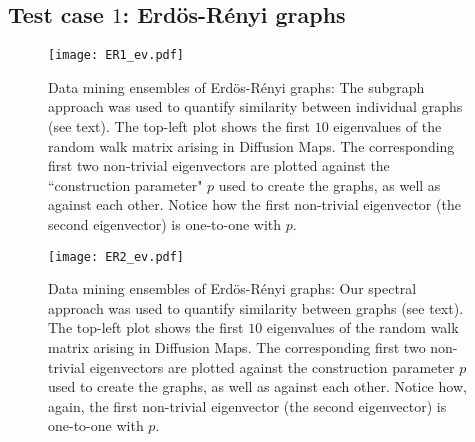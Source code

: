 \subsection{\label{ss:er} Test case $1$: Erd\"{o}s-R\'{e}nyi graphs}

\begin{figure}
  \begin{center}
    \texttt{[image: ER1\_ev.pdf]}
    \caption{\label{fig:ER1} Data mining ensembles of
      Erd\"{o}s-R\'{e}nyi graphs: The subgraph approach was used to
      quantify similarity between individual graphs (see text).  The
      top-left plot shows the first $10$ eigenvalues of the random
      walk matrix arising in Diffusion Maps.  The corresponding first
      two non-trivial eigenvectors are plotted against the
      ``construction parameter" $p$ used to create the graphs, as well
      as against each other.  Notice how the first non-trivial
      eigenvector (the second eigenvector) is one-to-one with $p$.  }
  \end{center}
\end{figure}

\begin{figure}
  \begin{center}
    \texttt{[image: ER2\_ev.pdf]}
    \caption{\label{fig:ER2} Data mining ensembles of
      Erd\"{o}s-R\'{e}nyi graphs: Our spectral approach was used to
      quantify similarity between graphs (see text). The top-left plot
      shows the first $10$ eigenvalues of the random walk matrix
      arising in Diffusion Maps. The corresponding first two
      non-trivial eigenvectors are plotted against the construction
      parameter $p$ used to create the graphs, as well as against each
      other.  Notice how, again, the first non-trivial eigenvector
      (the second eigenvector) is one-to-one with $p$.  }
  \end{center}
\end{figure}


